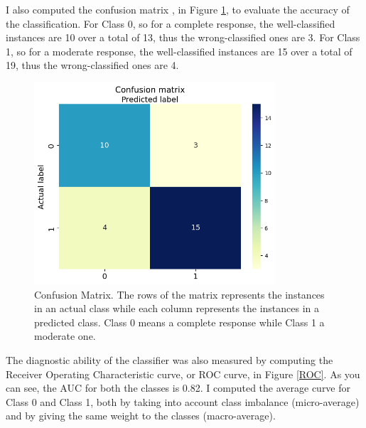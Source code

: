 \documentclass{standalone}
\begin{document}
\newpage
I also computed the confusion matrix , in Figure \ref{confmatrix}, to evaluate the accuracy of the classification.
For Class 0, so for a complete response, the well-classified instances are 10 over a total of 13, thus the wrong-classified ones are 3.
For Class 1, so for a moderate response, the well-classified instances are 15 over a total of 19, thus the wrong-classified ones are 4.


\begin{figure}[htp]

    \centering
    \includegraphics[width=0.8\textwidth]{../images/confmatrix.png}

    \caption{Confusion Matrix. The rows of the matrix represents the instances in an actual class while each column represents the instances in a predicted class. Class 0 means a complete response while Class 1 a moderate one. }
    \label{confmatrix}
    
\end{figure}

The diagnostic ability of the classifier was also measured by computing the Receiver Operating Characteristic curve, or ROC curve, in Figure \ref{ROC}.
As you can see, the AUC for both the classes is 0.82.
I computed the average curve for Class 0 and Class 1, both by taking into account class imbalance (micro-average) and by giving the same weight to the classes (macro-average). 
\end{document}

